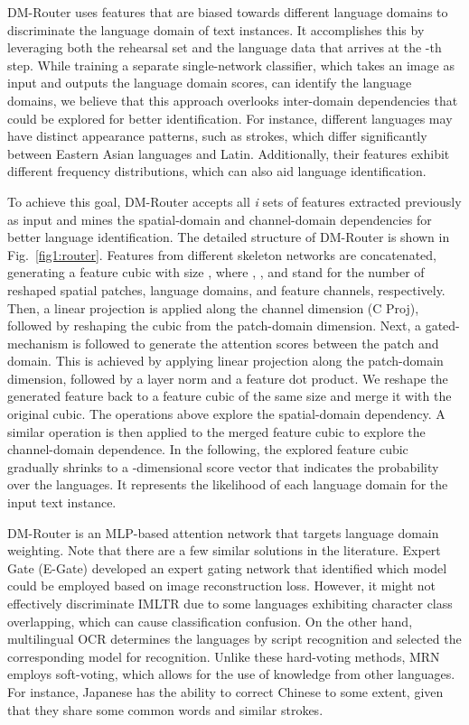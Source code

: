 \documentclass[10pt,twocolumn,letterpaper]{article}
\begin{document}
DM-Router uses features that are biased towards different language domains to discriminate the language domain of text instances. It accomplishes this by leveraging both the rehearsal set and the language data that arrives at the -th step. While training a separate single-network classifier, which takes an image as input and outputs the language domain scores, can identify the language domains, we believe that this approach overlooks inter-domain dependencies that could be explored for better identification. For instance, different languages may have distinct appearance patterns, such as strokes, which differ significantly between Eastern Asian languages and Latin. Additionally, their features exhibit different frequency distributions, which can also aid language identification.


To achieve this goal, DM-Router accepts all \emph{i} sets of features extracted previously as input and mines the spatial-domain and channel-domain dependencies for better language identification. The detailed structure of DM-Router is shown in Fig.~\ref{fig1:router}. Features from different skeleton networks are concatenated, generating a feature cubic with size , where , , and  stand for the number of reshaped spatial patches, language domains, and feature channels, respectively. Then, a linear projection is applied along the channel dimension (C Proj), followed by reshaping the cubic from the patch-domain dimension. Next, a gated-mechanism is followed to generate the attention scores between the patch and domain. This is achieved by applying linear projection along the patch-domain dimension, followed by a layer norm and a feature dot product. We reshape the generated feature back to a feature cubic of the same size and merge it with the original cubic. The operations above explore the spatial-domain dependency. A similar operation is then applied to the merged feature cubic to explore the channel-domain dependence. In the following, the explored feature cubic gradually shrinks to a -dimensional score vector that indicates the probability over the languages. It represents the likelihood of each language domain for the input text instance.   

DM-Router is an MLP-based attention network that targets language domain weighting. Note that there are a few similar solutions in the literature. Expert Gate (E-Gate) \cite{Aljundi2017expert_gate} developed an expert gating network that identified which model could be employed based on image reconstruction loss. However, it might not effectively discriminate IMLTR due to some languages exhibiting character class overlapping, which can cause classification confusion. On the other hand, multilingual OCR \cite{huang2021multiocr} determines the languages by script recognition and selected the corresponding model for recognition. Unlike these hard-voting methods, MRN employs soft-voting, which allows for the use of knowledge from other languages. For instance, Japanese has the ability to correct Chinese to some extent, given that they share some common words and similar strokes.
\end{document}
